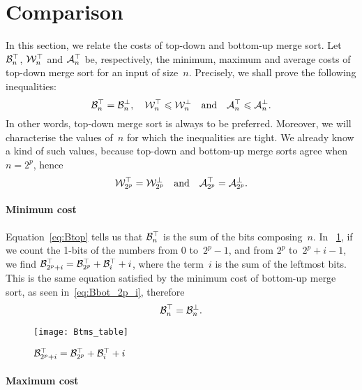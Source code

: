 \section{Comparison}

In this section, we relate the costs of top-down and bottom-up merge
sort. Let \(\mathcal{B}_{n}^{\top}\), \(\mathcal{W}_{n}^{\top}\) and \(\mathcal{A}_{n}^{\top}\) be,
respectively, the minimum, maximum and average costs of top-down merge
sort for an input of size~\(n\). Precisely, we shall prove the
following inequalities:
\begin{equation*}
\mathcal{B}_{n}^{\top} = \mathcal{B}_{n}^{\bot},
\quad
\mathcal{W}_{n}^{\top} \leqslant \mathcal{W}_{n}^{\bot}
\quad\text{and}\quad
\mathcal{A}_{n}^{\top} \leqslant \mathcal{A}_{n}^{\bot}.
\end{equation*}
In other words, top-down merge sort is always to be
preferred. Moreover, we will characterise the values of~\(n\) for
which the inequalities are tight. We already know a kind of such
values, because top-down and bottom-up merge sorts agree when
\(n=2^p\), hence
\begin{equation}
\mathcal{W}_{2^p}^{\top} = \mathcal{W}_{2^p}^{\bot}
\quad\text{and}\quad
\mathcal{A}_{2^p}^{\top} = \mathcal{A}_{2^p}^{\bot}.
\label{eq:2p}
\end{equation}

\paragraph{Minimum cost}

Equation~\eqref{eq:Btop} tells us that \(\mathcal{B}_{n}^{\top}\) is the sum of
the bits composing~\(n\). In \fig~\ref{fig:Btms_table},
if we count the 1-bits of the numbers from \(0\) to~\(2^p-1\), and
from \(2^p\) to~\(2^p+i-1\), we find \(\mathcal{B}_{2^p+i}^{\top} = \mathcal{B}_{2^p}^{\top}
+ \mathcal{B}_{i}^{\top} + i\), where the term~\(i\) is the sum of the leftmost
bits. This is the same equation satisfied by the minimum cost of
bottom-up merge sort, as seen in~\eqref{eq:Bbot_2p_i}, therefore
\begin{equation}
\mathcal{B}_{n}^{\top} = \mathcal{B}_{n}^{\bot}.
\label{eq:Btop_Bbot}
\end{equation}
\begin{figure}[h]
\centering
\texttt{[image: Btms\_table]}
\caption{$\protect\mathcal{B}_{2^p+i}^{\top} = \protect\mathcal{B}_{2^p}^{\top}
  + \protect\mathcal{B}_{i}^{\top} + i$\label{fig:Btms_table}}
\end{figure}

\paragraph{Maximum cost}

